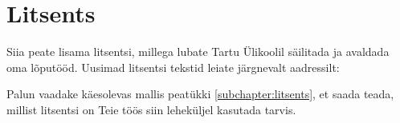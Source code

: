 \section*{Litsents} \label{litsents} 
Siia peate lisama litsentsi, millega lubate Tartu Ülikoolil säilitada ja avaldada oma lõputööd. Uusimad litsentsi tekstid leiate järgnevalt aadressilt: 


Palun vaadake käesolevas mallis peatükki \ref{subchapter:litsents}, et saada teada, millist litsentsi on Teie töös siin leheküljel kasutada tarvis.